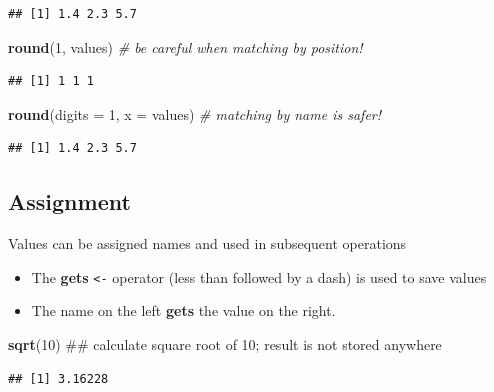 \documentclass[]{book}
\newenvironment{Shaded}{\begin{snugshade}}{\end{snugshade}}
\newcommand{\KeywordTok}[1]{\textcolor[rgb]{0.13,0.29,0.53}{\textbf{#1}}}
\newcommand{\DataTypeTok}[1]{\textcolor[rgb]{0.13,0.29,0.53}{#1}}
\newcommand{\DecValTok}[1]{\textcolor[rgb]{0.00,0.00,0.81}{#1}}
\newcommand{\CommentTok}[1]{\textcolor[rgb]{0.56,0.35,0.01}{\textit{#1}}}
\newcommand{\NormalTok}[1]{#1}
\providecommand{\tightlist}{%
  \setlength{\itemsep}{0pt}\setlength{\parskip}{0pt}}
\begin{document}
\begin{verbatim}
## [1] 1.4 2.3 5.7
\end{verbatim}

\begin{Shaded}
\begin{Highlighting}[]
\KeywordTok{round}\NormalTok{(}\DecValTok{1}\NormalTok{, values) }\CommentTok{# be careful when matching by position!}
\end{Highlighting}
\end{Shaded}

\begin{verbatim}
## [1] 1 1 1
\end{verbatim}

\begin{Shaded}
\begin{Highlighting}[]
\KeywordTok{round}\NormalTok{(}\DataTypeTok{digits =} \DecValTok{1}\NormalTok{, }\DataTypeTok{x =}\NormalTok{ values) }\CommentTok{# matching by name is safer!}
\end{Highlighting}
\end{Shaded}

\begin{verbatim}
## [1] 1.4 2.3 5.7
\end{verbatim}

\subsection{Assignment}\label{assignment}

Values can be assigned names and used in subsequent operations

\begin{itemize}
\tightlist
\item
  The \textbf{gets} \texttt{\textless{}-} operator (less than followed
  by a dash) is used to save values
\item
  The name on the left \textbf{gets} the value on the right.
\end{itemize}

\begin{Shaded}
\begin{Highlighting}[]
\KeywordTok{sqrt}\NormalTok{(}\DecValTok{10}\NormalTok{) ## calculate square root of 10; result is not stored anywhere}
\end{Highlighting}
\end{Shaded}

\begin{verbatim}
## [1] 3.16228
\end{verbatim}
\end{document}
